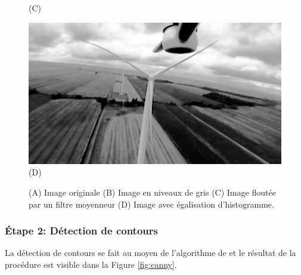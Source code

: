\begin{figure}[htp]
\begin{minipage}{0.49\textwidth}
  (C)
\end{minipage}
\begin{minipage}{0.49\textwidth}
  \centering
  \includegraphics[width=\linewidth]{images/preprocess_histogram.png}
  (D)
\end{minipage}
\caption[Prétraitement d'image pour la détection de lignes.]{(A) Image originale (B) Image en niveaux de gris (C) Image floutée par un filtre moyenneur (D) Image avec égalisation d'histogramme.}
\label{fig:detection_pretraitement}
\end{figure}

\subsubsection{Étape 2: Détection de contours}
La détection de contours se fait au moyen de l'algorithme de \citep{Canny1986} et le résultat de la procédure est visible dans la Figure \ref{fig:canny}.

